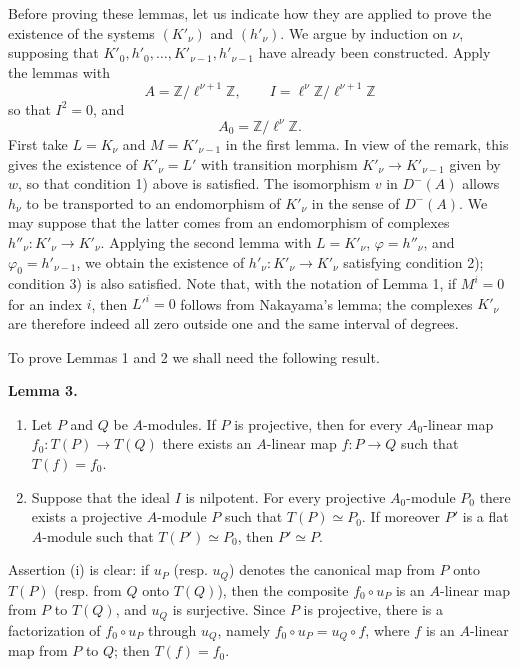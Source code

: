 \documentclass[11pt]{article}
\newenvironment{statement}[1]{\par\medskip\noindent\textbf{#1.}\ }{\par\medskip}
\begin{document}
Before proving these lemmas, let us indicate how they are applied to prove the existence of the systems $(K'_\nu)$ and $(h'_\nu)$. We argue by induction on $\nu$, supposing that $K'_0,h'_0,\ldots,K'_{\nu-1},h'_{\nu-1}$ have already been constructed. Apply the lemmas with
\[
A=\mathbb Z/\ell^{\nu+1}\mathbb Z,
\qquad
I=\ell^\nu\mathbb Z/\ell^{\nu+1}\mathbb Z
\]
so that $I^2=0$, and
\[
A_0=\mathbb Z/\ell^\nu\mathbb Z.
\]
First take $L=K_\nu$ and $M=K'_{\nu-1}$ in the first lemma. In view of the remark, this gives the existence of $K'_\nu=L'$ with transition morphism $K'_\nu\to K'_{\nu-1}$ given by $w$, so that condition 1) above is satisfied. The isomorphism $v$ in $D^-(A)$ allows $h_\nu$ to be transported to an endomorphism of $K'_\nu$ in the sense of $D^-(A)$. We may suppose that the latter comes from an endomorphism of complexes $h''_\nu:K'_\nu\to K'_\nu$. Applying the second lemma with $L=K'_\nu$, $\varphi=h''_\nu$, and $\varphi_0=h'_{\nu-1}$, we obtain the existence of $h'_\nu:K'_\nu\to K'_\nu$ satisfying condition 2); condition 3) is also satisfied. Note that, with the notation of Lemma 1, if $M^i=0$ for an index $i$, then $L'^i=0$ follows from Nakayama's lemma; the complexes $K'_\nu$ are therefore indeed all zero outside one and the same interval of degrees.

To prove Lemmas 1 and 2 we shall need the following result.

\begin{statement}{Lemma 3}
\begin{enumerate}[label=(\roman*)]
\item Let $P$ and $Q$ be $A$-modules. If $P$ is projective, then for every $A_0$-linear map $f_0:T(P)\to T(Q)$ there exists an $A$-linear map $f:P\to Q$ such that $T(f)=f_0$.
\item Suppose that the ideal $I$ is nilpotent. For every projective $A_0$-module $P_0$ there exists a projective $A$-module $P$ such that $T(P)\simeq P_0$. If moreover $P'$ is a flat $A$-module such that $T(P')\simeq P_0$, then $P'\simeq P$.
\end{enumerate}
\end{statement}

Assertion (i) is clear: if $u_P$ (resp. $u_Q$) denotes the canonical map from $P$ onto $T(P)$ (resp. from $Q$ onto $T(Q)$), then the composite $f_0\circ u_P$ is an $A$-linear map from $P$ to $T(Q)$, and $u_Q$ is surjective. Since $P$ is projective, there is a factorization of $f_0\circ u_P$ through $u_Q$, namely $f_0\circ u_P=u_Q\circ f$, where $f$ is an $A$-linear map from $P$ to $Q$; then $T(f)=f_0$.
\end{document}
